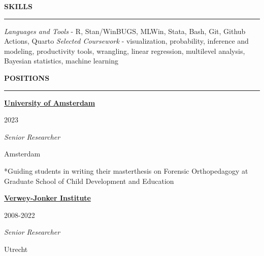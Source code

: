\documentclass[
  16,
]{article}
\begin{document}
\begin{large}{\bf SKILLS}
  \vspace{3pt}
  \hrule
\end{large}
\vspace{-0.16cm}
\begin{large}
\emph{Languages and Tools} - R, Stan/WinBUGS, MLWin, Stata, Bash, Git, Github Actions, Quarto   
\emph{Selected Coursework} - visualization, probability, inference  and modeling, productivity tools, wrangling, linear regression, multilevel analysis, Bayesian statistics, machine learning
\end{large}

\begin{large}{\bf POSITIONS}
  \vspace{3pt}
  \hrule
  \begin{large}
  \begin{multicols}{2}
    \begin{flushleft}{\bf \href{https://www.uva.nl/}{University of Amsterdam}}\end{flushleft}
    \begin{flushright}2023\end{flushright}
  \end{multicols}
  \vspace{-0.17cm}
  \begin{multicols}{2}
    \begin{flushleft}\textit{Senior Researcher}\end{flushleft}
    \begin{flushright}Amsterdam\end{flushright}\end
  {multicols}
\end{large}
\vspace{-0.16cm}

*Guiding students in writing their masterthesis on Forensic
Orthopedagogy at Graduate School of Child Development and Education

\vspace{7pt}

\begin{large}
  \begin{multicols}{2}
    \begin{flushleft}{\bf \href{https://www.verwey-jonker.nl/}{Verwey-Jonker Institute}}\end{flushleft}
    \begin{flushright}2008-2022\end{flushright}
  \end{multicols}
  \vspace{-0.17cm}
  \begin{multicols}{2}
    \begin{flushleft}\textit{Senior Researcher}\end{flushleft}
    \begin{flushright}Utrecht\end{flushright}\end
  {multicols}
\end{large}
\vspace{-0.16cm}


\end{large}
\end{document}

